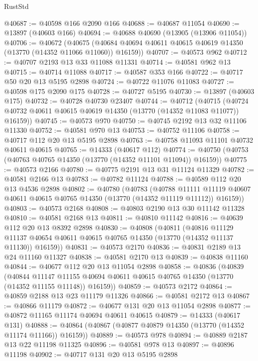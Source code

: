 \begin{lexlean}{RustStd}
\begin{coremodule}
@40687 := @40598 @166 @2090 @166
@40688 := @40687 @11054
@40690 := @13897 (@40603 @166)
@40694 := @40688 @40690 (@13905 (@13906 @11054))
@40706 := @40672
    (@40675 (@40684 @40694 @40611 @40615 @40619 @14350 (@13770 (@14352 @11066 @11060)) @16159))
@40707 := @40573 @962
@40712 := @40707 @2193 @13 @33 @11088 @11331
@40714 := @40581 @962 @13
@40715 := @40714 @11088
@40717 := @40587 @353 @166
@40722 := @40717 @50 @20 @13 @5195 @2898
@40724 := @40722 @11076 @11083
@40727 := @40598 @175 @2090 @175
@40728 := @40727 @5195
@40730 := @13897 (@40603 @175)
@40732 := @40728 @40730 @23407
@40744 := @40712
    (@40715 (@40724 @40732 @40611 @40615 @40619 @14350 (@13770 (@14352 @11083 @11077)) @16159))
@40745 := @40573 @970
@40750 := @40745 @2192 @13 @32 @11106 @11330
@40752 := @40581 @970 @13
@40753 := @40752 @11106
@40758 := @40717 @112 @20 @13 @5195 @2898
@40763 := @40758 @11093 @11101 @40732 @40611 @40615
@40765 := @14333 (@40617 @112)
@40774 := @40750 (@40753 (@40763 @40765 @14350 (@13770 (@14352 @11101 @11094)) @16159))
@40775 := @40573 @2166
@40780 := @40775 @2191 @13 @31 @11124 @11329
@40782 := @40581 @2166 @13
@40783 := @40782 @11124
@40788 := @40589 @112 @20 @13 @4536 @2898
@40802 := @40780
    (@40783
      (@40788
        @11111
        @11119
        @40607
        @40611
        @40615
        @40765
        @14350
        (@13770 (@14352 @11119 @11112))
        @16159))
@40803 := @40573 @2168
@40808 := @40803 @2190 @13 @30 @11142 @11328
@40810 := @40581 @2168 @13
@40811 := @40810 @11142
@40816 := @40639 @112 @20 @13 @8392 @2898
@40830 := @40808
    (@40811
      (@40816
        @11129
        @11137
        @40654
        @40611
        @40615
        @40765
        @14350
        (@13770 (@14352 @11137 @11130))
        @16159))
@40831 := @40573 @2170
@40836 := @40831 @2189 @13 @24 @11160 @11327
@40838 := @40581 @2170 @13
@40839 := @40838 @11160
@40844 := @40677 @112 @20 @13 @11054 @2898
@40858 := @40836
    (@40839
      (@40844
        @11147
        @11155
        @40694
        @40611
        @40615
        @40765
        @14350
        (@13770 (@14352 @11155 @11148))
        @16159))
@40859 := @40573 @2172
@40864 := @40859 @2188 @13 @23 @11179 @11326
@40866 := @40581 @2172 @13
@40867 := @40866 @11179
@40872 := @40677 @131 @20 @13 @11054 @2898
@40877 := @40872 @11165 @11174 @40694 @40611 @40615
@40879 := @14333 (@40617 @131)
@40888 := @40864 (@40867 (@40877 @40879 @14350 (@13770 (@14352 @11174 @11166)) @16159))
@40889 := @40573 @978
@40894 := @40889 @2187 @13 @22 @11198 @11325
@40896 := @40581 @978 @13
@40897 := @40896 @11198
@40902 := @40717 @131 @20 @13 @5195 @2898

\end{coremodule}
\end{lexlean}
